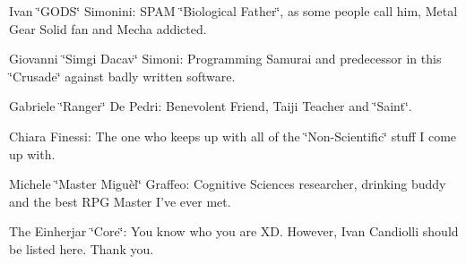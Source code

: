\begin{DoxyItemize}
\item Ivan \char`\"{}GODS\char`\"{} Simonini: SPAM \char`\"{}Biological Father\char`\"{}, as some people call him, Metal Gear Solid fan and Mecha addicted.
\item Giovanni \char`\"{}Simgi Dacav\char`\"{} Simoni: Programming Samurai and predecessor in this \char`\"{}Crusade\char`\"{} against badly written software.
\item Gabriele \char`\"{}Ranger\char`\"{} De Pedri: Benevolent Friend, Taiji Teacher and \char`\"{}Saint\char`\"{}.
\item Chiara Finessi: The one who keeps up with all of the \char`\"{}Non-\/Scientific\char`\"{} stuff I come up with.
\item Michele \char`\"{}Master Miguèl\char`\"{} Graffeo: Cognitive Sciences researcher, drinking buddy and the best RPG Master I've ever met.
\item The Einherjar \char`\"{}Core\char`\"{}: You know who you are XD. However, Ivan Candiolli should be listed here. Thank you. 
\end{DoxyItemize}